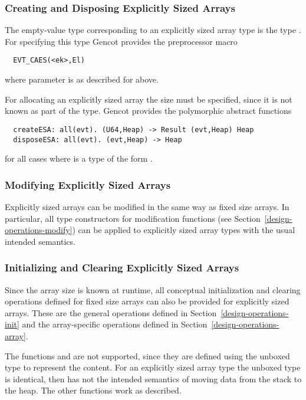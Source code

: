 \subsubsection{Creating and Disposing Explicitly Sized Arrays}

The empty-value type corresponding to an explicitly sized array type  is the type .
For specifying this type Gencot provides the preprocessor macro
\begin{verbatim}
  EVT_CAES(<ek>,El)
\end{verbatim}
where parameter  is as described for  above.

For allocating an explicitly sized array the size must be specified, since it is not known as part of the type.
Gencot provides the polymorphic abstract functions
\begin{verbatim}
  createESA: all(evt). (U64,Heap) -> Result (evt,Heap) Heap
  disposeESA: all(evt). (evt,Heap) -> Heap
\end{verbatim}
for all cases where  is a type of the form .

\subsubsection{Modifying Explicitly Sized Arrays}

Explicitly sized arrays can be modified in the same way as fixed size arrays. In particular, 
all type constructors for modification functions (see Section~\ref{design-operations-modify}) can be applied to 
explicitly sized array types with the usual intended semantics. 

\subsubsection{Initializing and Clearing Explicitly Sized Arrays}

Since the array size is known at runtime, all conceptual initialization and clearing operations defined for fixed
size arrays can also be provided for explicitly sized arrays. These are the general operations defined in 
Section~\ref{design-operations-init} and the array-specific operations defined in Section~\ref{design-operations-array}.

The functions  and  are not supported, since they are defined using the unboxed type 
to represent the content. For an explicitly sized array type the unboxed type is identical, then  has not the
intended semantics of moving data from the stack to the heap. The other functions work as described.

